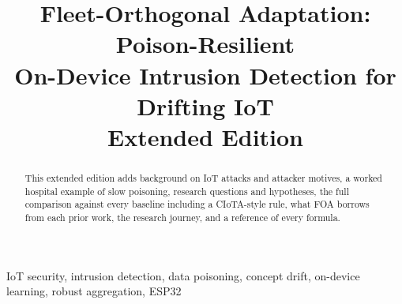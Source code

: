 \documentclass[conference]{IEEEtran}
\theoremstyle{definition}
\begin{document}
\title{Fleet-Orthogonal Adaptation: Poison-Resilient\\On-Device Intrusion Detection for Drifting IoT\\\large Extended Edition}

\author{
}

\maketitle

\begin{abstract}


This extended edition adds background on IoT attacks and attacker motives, a worked hospital example of slow poisoning, research questions and hypotheses, the full comparison against every baseline including a CIoTA-style rule, what FOA borrows from each prior work, the research journey, and a reference of every formula.
\end{abstract}

\begin{IEEEkeywords}
IoT security, intrusion detection, data poisoning, concept drift, on-device learning, robust aggregation, ESP32
\end{IEEEkeywords}



\appendices




\end{document}
